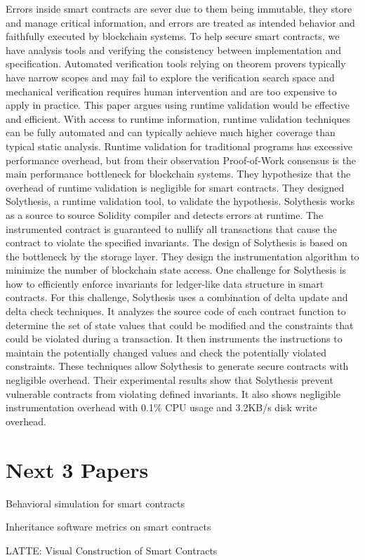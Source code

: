 \documentclass{article}
\begin{document}
Errors inside smart contracts are sever due to them being immutable, they store and manage critical information, and errors are treated as intended behavior and faithfully executed by blockchain systems. To help secure smart contracts, we have analysis tools and verifying the consistency between implementation and specification. Automated verification tools relying on theorem provers typically have narrow scopes and may fail to explore the verification search space and mechanical verification requires human intervention and are too expensive to apply in practice. This paper argues using runtime validation would be effective and efficient. With access to runtime information, runtime validation techniques can be fully automated and can typically achieve much higher coverage than typical static analysis. Runtime validation for traditional programs has excessive performance overhead, but from their observation Proof-of-Work consensus is the main performance bottleneck for blockchain systems. They hypothesize that the overhead of runtime validation is negligible for smart contracts. They designed Solythesis, a runtime validation tool, to validate the hypothesis. Solythesis works as a source to source Solidity compiler and detects errors at runtime. The instrumented contract is guaranteed to nullify all transactions that cause the contract to violate the specified invariants. The design of Solythesis is based on the bottleneck by the storage layer. They design the instrumentation algorithm to minimize the number of blockchain state access. One challenge for Solythesis is how to efficiently enforce invariants for ledger-like data structure in smart contracts. For this challenge, Solythesis uses a combination of delta update and delta check techniques. It analyzes the source code of each contract function to determine the set of state values that could be modified and the constraints that could be violated during a transaction. It then instruments the instructions to maintain the potentially changed values and check the potentially violated constraints. These techniques allow Solythesis to generate secure contracts with negligible overhead. Their experimental results show that Solythesis prevent vulnerable contracts from violating defined invariants. It also shows negligible instrumentation overhead with 0.1\% CPU usage and 3.2KB/s disk write overhead.

\section{Next 3 Papers}
\item Behavioral simulation for smart contracts
\item Inheritance software metrics on smart contracts
\item LATTE: Visual Construction of Smart Contracts

\printbibliography
\end{document}

